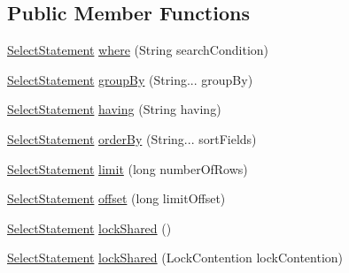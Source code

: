 \subsection*{Public Member Functions}
\begin{DoxyCompactItemize}
\item 
\mbox{\hyperlink{interfacecom_1_1mysql_1_1cj_1_1xdevapi_1_1_select_statement}{Select\+Statement}} \mbox{\hyperlink{interfacecom_1_1mysql_1_1cj_1_1xdevapi_1_1_select_statement_af8a0e6c10a2091b4e6a8d6ae74e5713f}{where}} (String search\+Condition)
\item 
\mbox{\hyperlink{interfacecom_1_1mysql_1_1cj_1_1xdevapi_1_1_select_statement}{Select\+Statement}} \mbox{\hyperlink{interfacecom_1_1mysql_1_1cj_1_1xdevapi_1_1_select_statement_aa711a5de1c387d46ff0a940329837ae0}{group\+By}} (String... group\+By)
\item 
\mbox{\hyperlink{interfacecom_1_1mysql_1_1cj_1_1xdevapi_1_1_select_statement}{Select\+Statement}} \mbox{\hyperlink{interfacecom_1_1mysql_1_1cj_1_1xdevapi_1_1_select_statement_ab1dde96bbcd60811cce5a6181008d441}{having}} (String having)
\item 
\mbox{\hyperlink{interfacecom_1_1mysql_1_1cj_1_1xdevapi_1_1_select_statement}{Select\+Statement}} \mbox{\hyperlink{interfacecom_1_1mysql_1_1cj_1_1xdevapi_1_1_select_statement_a79a5fd02de586c02a6179002efe76efa}{order\+By}} (String... sort\+Fields)
\item 
\mbox{\hyperlink{interfacecom_1_1mysql_1_1cj_1_1xdevapi_1_1_select_statement}{Select\+Statement}} \mbox{\hyperlink{interfacecom_1_1mysql_1_1cj_1_1xdevapi_1_1_select_statement_a434d35e15b13407d7a67df13c5c0d0f9}{limit}} (long number\+Of\+Rows)
\item 
\mbox{\hyperlink{interfacecom_1_1mysql_1_1cj_1_1xdevapi_1_1_select_statement}{Select\+Statement}} \mbox{\hyperlink{interfacecom_1_1mysql_1_1cj_1_1xdevapi_1_1_select_statement_af36d8c50049615adbb960284711af58b}{offset}} (long limit\+Offset)
\item 
\mbox{\hyperlink{interfacecom_1_1mysql_1_1cj_1_1xdevapi_1_1_select_statement}{Select\+Statement}} \mbox{\hyperlink{interfacecom_1_1mysql_1_1cj_1_1xdevapi_1_1_select_statement_aeee3b8b28d07cd0609e01164fda0bfd3}{lock\+Shared}} ()
\item 
\mbox{\hyperlink{interfacecom_1_1mysql_1_1cj_1_1xdevapi_1_1_select_statement}{Select\+Statement}} \mbox{\hyperlink{interfacecom_1_1mysql_1_1cj_1_1xdevapi_1_1_select_statement_a2ada4b9bb1be4e07ef8593ff9e777ad0}{lock\+Shared}} (Lock\+Contention lock\+Contention)
\item 

\end{DoxyCompactItemize}
